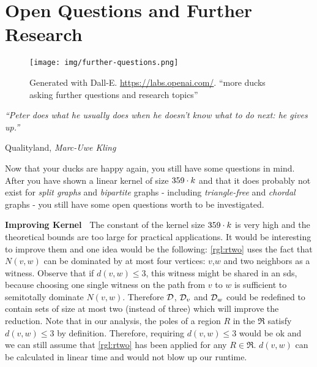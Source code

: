 \chapter{Open Questions and Further Research}\label{ch:closing}

\vspace*{-50pt}

\begin{figure}[ht]
        \texttt{[image: img/further-questions.png]}
        \captionsetup{textformat=empty,labelformat=blank}
        \caption[Generated with Dalle-E. Knowledge Cutoff 09-2022]{Generated with Dall-E. \url{https://labs.openai.com/}. ``more ducks asking further questions and research topics''}
\end{figure}

\epigraph{\itshape ``Peter does what he usually does when he doesn’t know what to do next: he gives up.''}{Qualityland, \textit{Marc-Uwe Kling}}

Now that your ducks are happy again, you still have some questions in mind.
After you have shown a linear kernel of size $359 \cdot k$ and that it does probably not exist for \textit{split graphs} and \textit{bipartite} graphs - including \textit{triangle-free} and \textit{chordal} graphs - you still have some open questions worth to be investigated.


\noindent \textbf{Improving Kernel~}
The constant of the kernel size $359 \cdot k$ is very high and the theoretical bounds are too large for practical applications. 
It would be interesting to improve them and one idea would be the following:
\cref{rgl:rtwo} uses the fact that $N(v,w)$ can be dominated by at most four vertices: $v$,$w$ and two neighbors as a witness.
Observe that if $d(v,w) \leq 3$, this witness might be shared in an sds, because choosing one single witness on the path from $v$ to $w$ is sufficient to semitotally dominate $N(v,w)$.
Therefore $\mathcal{D}$, $\mathcal{D}_{v}$ and $\mathcal{D}_{w}$ could be redefined to contain sets of size at most two (instead of three) which will improve the reduction. 
Note that in our analysis, the poles of a region $R$ in the \dreg $\mathfrak{R}$ satisfy $d(v,w) \leq 3$ by definition.
Therefore, requiring $d(v,w) \leq 3$ would be ok and we can still assume that \cref{rgl:rtwo} has been applied for any $R \in \mathfrak{R}$.
$d(v,w)$ can be calculated in linear time and would not blow up our runtime.

